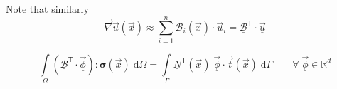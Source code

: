 \documentclass[times,namecite]{goose-article}
\begin{document}
Note that similarly
\begin{equation}
  \vec{\nabla} \vec{u} (\vec{x})
  \approx
  \sum\limits_{i=1}^{n}
  \mathcal{B}_i (\vec{x}) \cdot \vec{u}_i
  =
  \underline{\mathcal{B}}^\mathsf{T} \cdot \underline{\vec{u}}
\end{equation}


\begin{equation}
  \int\limits_\Omega
    \left( \underline{\mathcal{B}}^\mathsf{T} \cdot \underline{\vec{\phi}} \right) : \bm{\sigma}(\vec{x}) \;
  \mathrm{d}\Omega
  =
  \int\limits_\Gamma
    \underline{N}^\mathsf{T}(\vec{x}) \; \underline{\vec{\phi}} \cdot \vec{t}(\vec{x}) \;
  \mathrm{d}\Gamma
  \qquad
  \forall \; \underline{\vec{\phi}} \in \mathbb{R}^d
\end{equation}
\end{document}
